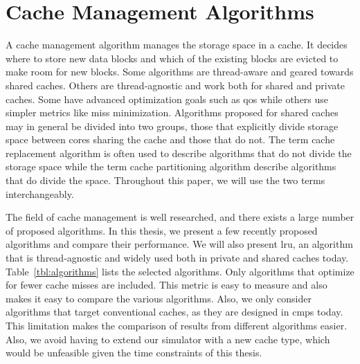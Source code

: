 
\chapter{Cache Management Algorithms}
\label{cpt:algorithms}


A cache management algorithm manages the storage space in a cache.
It decides where to store new data blocks and which of the existing blocks are evicted to make room for new blocks.
Some algorithms are thread-aware and geared towards shared caches.
Others are thread-agnostic and work both for shared and private caches.
Some have advanced optimization goals such as \gls{qos} while others use simpler metrics like miss minimization.
Algorithms proposed for shared caches may in general be divided into two groups, those that explicitly divide storage space between cores sharing the cache and those that do not.
The term cache replacement algorithm is often used to describe algorithms that do not divide the storage space while the term cache partitioning algorithm describe algorithms that do divide the space.
Throughout this paper, we will use the two terms interchangeably.

The field of cache management is well researched, and there exists a large number of proposed algorithms.
In this thesis, we present a few recently proposed algorithms and compare their performance.
We will also present \gls{lru}, an algorithm that is thread-agnostic and widely used both in private and shared caches today.
Table~\ref{tbl:algorithms} lists the selected algorithms.
Only algorithms that optimize for fewer cache misses are included.
This metric is easy to measure and also makes it easy to compare the various algorithms.
Also, we only consider algorithms that target conventional caches, as they are designed in \glspl{cmp} today.
This limitation makes the comparison of results from different algorithms easier.
Also, we avoid having to extend our simulator with a new cache type, which would be unfeasible given the time constraints of this thesis.

